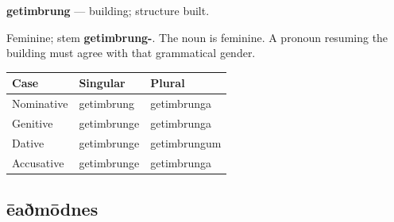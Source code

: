 \par\begin{minipage}{\linewidth}\raggedright
\textbf{getimbrung} — building; structure built.

Feminine; stem \textbf{getimbrung-}. The noun is feminine. A pronoun resuming the building must agree with that grammatical gender.

\par\begingroup
\fontsize{10.5}{13.2}\selectfont
\setlength{\LTleft}{0pt}\setlength{\LTright}{\fill}
\noindent
\begin{tabular}{@{}>{\raggedright\arraybackslash}p{35.87mm}>{\raggedright\arraybackslash}p{39.46mm}>{\raggedright\arraybackslash}p{43.05mm}@{}}
\toprule
\textbf{Case} & \textbf{Singular} & \textbf{Plural} \\
\midrule
Nominative & getimbrung & getimbrunga \\
Genitive & getimbrunge & getimbrunga \\
Dative & getimbrunge & getimbrungum \\
Accusative & getimbrunge & getimbrunga \\
\bottomrule
\end{tabular}
\par\endgroup

\end{minipage}\par
{}
\subsection*{ēaðmōdnes}


